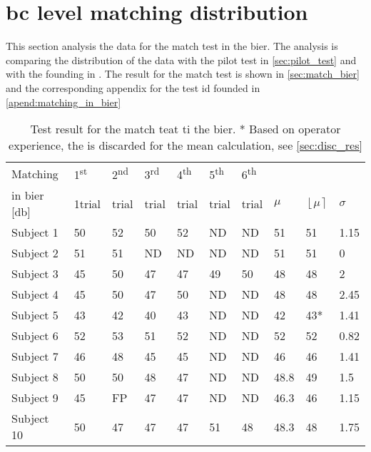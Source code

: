 \section{\gls{bc} level matching distribution}
This section analysis the data for the match test in the \gls{bier}. The analysis is comparing the distribution of the data with the pilot test in \autoref{sec:pilot_test} and with the founding in \citep{STENFELT201385}. The result for the match test is shown in \autoref{sec:match_bier} and the corresponding appendix for the test id founded in \autoref{apend:matching_in_bier}

\begin{table}[H]
\centering
\caption{Test result for the match teat ti the \gls{bier}. * Based on operator experience, the  is discarded for the mean calculation, see \autoref{sec:disc_res}}
\begin{tabular}{llllllllll}
\multicolumn{1}{l|}{Matching }   & 1\textsuperscript{st}  & 2\textsuperscript{nd}  & 3\textsuperscript{rd}  & 4\textsuperscript{th} & 5\textsuperscript{th}  & \multicolumn{1}{l|}{6\textsuperscript{th} }                &    & &  \\
\multicolumn{1}{l|}{in \gls{bier} [\si{\decibel}] }   & 1trial & trial &  trial &  trial &  trial & \multicolumn{1}{l|}{trial}                & $\mu$ & $\left \lfloor  \mu \right \rceil$  & $\sigma$ \\ \hline
\multicolumn{1}{l|}{Subject 1}  & 50    & 52    & 50    & 52    & ND    & \multicolumn{1}{l|}{ND} & 51 & 51 & 1.15  \\
\multicolumn{1}{l|}{Subject 2}  & 51    & 51    & ND    & ND    & ND    & \multicolumn{1}{l|}{ND} & 51 &  51& 0     \\
\multicolumn{1}{l|}{Subject 3}  & 45    & 50    & 47    & 47    & 49    & \multicolumn{1}{l|}{50} & 48  & 48 & 2    \\
\multicolumn{1}{l|}{Subject 4}  & 45    & 50    & 47    & 50    & ND    & \multicolumn{1}{l|}{ND} & 48  &48 & 2.45  \\
\multicolumn{1}{l|}{Subject 5}  & 43    & 42    & 40    & 43    & ND    & \multicolumn{1}{l|}{ND} & 42  & 43* & 1.41  \\
\multicolumn{1}{l|}{Subject 6}  & 52    & 53    & 51    & 52    & ND    & \multicolumn{1}{l|}{ND} & 52  & 52 & 0.82  \\
\multicolumn{1}{l|}{Subject 7}  & 46    & 48    & 45    & 45    & ND    & \multicolumn{1}{l|}{ND} & 46  & 46 & 1.41  \\
\multicolumn{1}{l|}{Subject 8}  & 50    & 50    & 48    & 47    & ND    & \multicolumn{1}{l|}{ND} & 48.8 & 49 & 1.5   \\
\multicolumn{1}{l|}{Subject 9}  & 45    & FP    & 47    & 47    & ND    & \multicolumn{1}{l|}{ND} & 46.3 & 46 & 1.15  \\
\multicolumn{1}{l|}{Subject 10} & 50    & 47    & 47    & 47    & 51    & \multicolumn{1}{l|}{48} & 48.3 & 48 & 1.75 
\end{tabular}
\label{sec:match_bier} 
\end{table}



